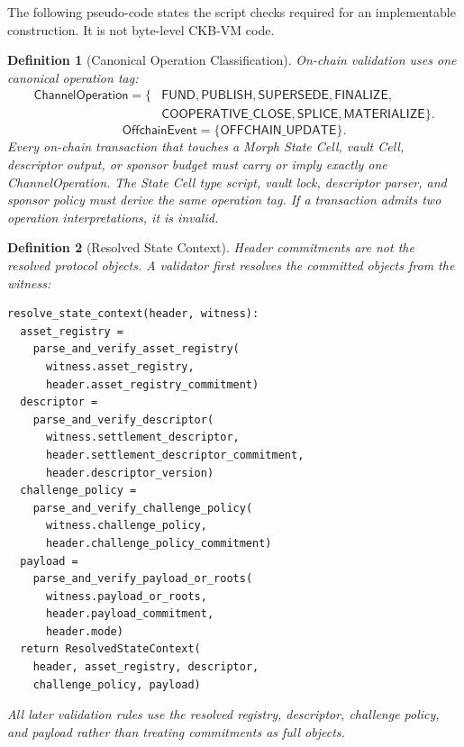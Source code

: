 \documentclass[a4paper,11pt]{article}
\newtheorem{definition}{Definition}
\begin{document}
The following pseudo-code states the script checks required for an implementable construction. It is not byte-level CKB-VM code.

\begin{definition}[Canonical Operation Classification]
On-chain validation uses one canonical operation tag:
\[
\begin{aligned}
\mathsf{ChannelOperation}=\{&
\mathsf{FUND},\mathsf{PUBLISH},\mathsf{SUPERSEDE},
\mathsf{FINALIZE},\\
&\mathsf{COOPERATIVE\_CLOSE},\mathsf{SPLICE},
\mathsf{MATERIALIZE}\}.
\end{aligned}
\]
\[
\mathsf{OffchainEvent}=\{\mathsf{OFFCHAIN\_UPDATE}\}.
\]
Every on-chain transaction that touches a Morph State Cell, vault Cell,
descriptor output, or sponsor budget must carry or imply exactly one
\textsf{ChannelOperation}. The State Cell type script, vault lock, descriptor
parser, and sponsor policy must derive the same operation tag. If a transaction
admits two operation interpretations, it is invalid.
\end{definition}

\begin{definition}[Resolved State Context]
Header commitments are not the resolved protocol objects. A validator first
resolves the committed objects from the witness:
\begin{lstlisting}
resolve_state_context(header, witness):
  asset_registry =
    parse_and_verify_asset_registry(
      witness.asset_registry,
      header.asset_registry_commitment)
  descriptor =
    parse_and_verify_descriptor(
      witness.settlement_descriptor,
      header.settlement_descriptor_commitment,
      header.descriptor_version)
  challenge_policy =
    parse_and_verify_challenge_policy(
      witness.challenge_policy,
      header.challenge_policy_commitment)
  payload =
    parse_and_verify_payload_or_roots(
      witness.payload_or_roots,
      header.payload_commitment,
      header.mode)
  return ResolvedStateContext(
    header, asset_registry, descriptor,
    challenge_policy, payload)
\end{lstlisting}
All later validation rules use the resolved registry, descriptor, challenge
policy, and payload rather than treating commitments as full objects.
\end{definition}
\end{document}
